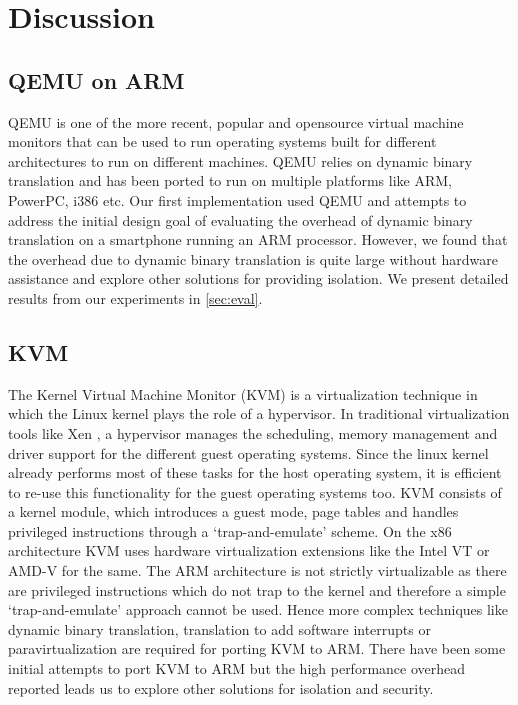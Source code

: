 \section{Discussion}
\label{sec:discuss}

\subsection{QEMU on ARM}
QEMU \cite{qemu} is one of the more recent, popular and opensource virtual machine monitors that can be used to run operating systems built for different architectures to run on different machines. QEMU relies on dynamic binary translation and has been ported to run on multiple platforms like ARM, PowerPC, i386 etc. Our first implementation used QEMU and attempts to address the initial design goal of evaluating the overhead of dynamic binary translation on a smartphone running an ARM processor. However, we found that the overhead due to dynamic binary translation is quite large without hardware assistance and explore other solutions for providing isolation. We present detailed results from our experiments in \ref{sec:eval}.

\subsection{KVM}
The Kernel Virtual Machine Monitor (KVM) is a virtualization technique in which the Linux kernel plays the role of a hypervisor. In traditional virtualization tools like Xen \cite{xen}, a hypervisor manages the scheduling, memory management and driver support for the different guest operating systems. Since the linux kernel already performs most of these tasks for the host operating system, it is efficient to re-use this functionality for the guest operating systems too. KVM consists of a kernel module, which introduces a guest mode,  page tables and handles privileged instructions through a `trap-and-emulate' scheme. On the x86 architecture KVM uses hardware virtualization extensions like the Intel VT or AMD-V for the same. 
The ARM architecture is not strictly virtualizable as there are privileged instructions which do not trap to the kernel and therefore a simple `trap-and-emulate' approach cannot be used. Hence more complex techniques like dynamic binary translation, translation to add software interrupts or paravirtualization are required for porting KVM to ARM. There have been some initial attempts to port KVM to ARM \cite{columbia} but the high performance overhead reported leads us to explore other solutions for isolation and security. 

